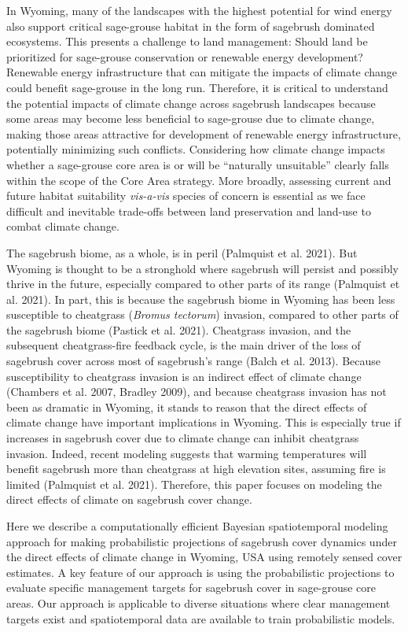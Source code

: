 \documentclass[
  12pt,
]{article}
\begin{document}
In Wyoming, many of the landscapes with the highest potential for wind energy also support critical sage-grouse habitat in the form of sagebrush dominated ecosystems.
This presents a challenge to land management: Should land be prioritized for sage-grouse conservation or renewable energy development?
Renewable energy infrastructure that can mitigate the impacts of climate change could benefit sage-grouse in the long run.
Therefore, it is critical to understand the potential impacts of climate change across sagebrush landscapes because some areas may become less beneficial to sage-grouse due to climate change, making those areas attractive for development of renewable energy infrastructure, potentially minimizing such conflicts.
Considering how climate change impacts whether a sage-grouse core area is or will be ``naturally unsuitable'' clearly falls within the scope of the Core Area strategy.
More broadly, assessing current and future habitat suitability \emph{vis-a-vis} species of concern is essential as we face difficult and inevitable trade-offs between land preservation and land-use to combat climate change.

The sagebrush biome, as a whole, is in peril (Palmquist et al. 2021).
But Wyoming is thought to be a stronghold where sagebrush will persist and possibly thrive in the future, especially compared to other parts of its range (Palmquist et al. 2021).
In part, this is because the sagebrush biome in Wyoming has been less susceptible to cheatgrass (\emph{Bromus tectorum}) invasion, compared to other parts of the sagebrush biome (Pastick et al. 2021).
Cheatgrass invasion, and the subsequent cheatgrass-fire feedback cycle, is the main driver of the loss of sagebrush cover across most of sagebrush's range (Balch et al. 2013).
Because susceptibility to cheatgrass invasion is an indirect effect of climate change (Chambers et al. 2007, Bradley 2009), and because cheatgrass invasion has not been as dramatic in Wyoming, it stands to reason that the direct effects of climate change have important implications in Wyoming.
This is especially true if increases in sagebrush cover due to climate change can inhibit cheatgrass invasion.
Indeed, recent modeling suggests that warming temperatures will benefit sagebrush more than cheatgrass at high elevation sites, assuming fire is limited (Palmquist et al. 2021).
Therefore, this paper focuses on modeling the direct effects of climate on sagebrush cover change.

Here we describe a computationally efficient Bayesian spatiotemporal modeling approach for making probabilistic projections of sagebrush cover dynamics under the direct effects of climate change in Wyoming, USA using remotely sensed cover estimates.
A key feature of our approach is using the probabilistic projections to evaluate specific management targets for sagebrush cover in sage-grouse core areas.
Our approach is applicable to diverse situations where clear management targets exist and spatiotemporal data are available to train probabilistic models.
\end{document}
